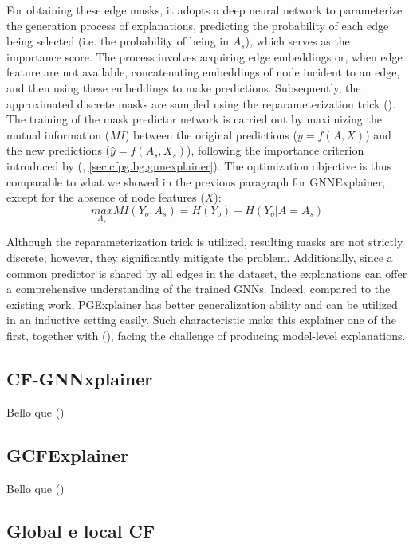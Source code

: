 \documentclass[binding=0.6cm]{sapthesis}
\newcommand{\mycite}[1]{(\cite{#1})}
\begin{document}
For obtaining these edge masks, it adopts a deep neural network to parameterize the generation process of explanations, predicting the probability of each edge being selected (i.e. the probability of being in $A_s$), which serves as the importance score. The process involves acquiring edge embeddings or, when edge feature are not available, concatenating embeddings of node incident to an edge, and then using these embeddings to make predictions. Subsequently, the approximated discrete masks are sampled using the reparameterization trick \mycite{niculae2023-discrete}. The training of the mask predictor network is carried out by maximizing the mutual information ($MI$) between the original predictions ($y = f(A,X)$) and the new predictions ($\hat y = f(A_s,X_s)$), following the importance criterion introduced by (\cite{ying2019-gnnexplainer}, \cref{sec:cfpg.bg.gnnexplainer}). The optimization objective is thus comparable to what we showed in the previous paragraph for GNNExplainer, except for the absence of node features ($X$): 
\begin{equation}
    \underset{A_s}{max} MI(Y_o,A_s) = H(Y_o) - H(Y_o| A = A_s)
    \label{eq:cfpg.bg.mutual-info-pge}
\end{equation}

Although the reparameterization trick is utilized, resulting masks are not strictly discrete; however, they significantly mitigate the  problem. Additionally, since a common predictor is shared by all edges in the dataset, the explanations can offer a comprehensive understanding of the trained GNNs. Indeed, compared to the existing work, PGExplainer has better generalization ability and can be utilized in an inductive setting easily. Such characteristic make this explainer one of the first, together with \mycite{yuan2020-xgnn}, facing the challenge of producing model-level explanations.   

\subsection{CF-GNNxplainer}
\label{sec:cfpg.bg.cf-gnn}
Bello que \mycite{lucic2022-cfgnnexplainer}

\subsection{GCFExplainer}
\label{sec:cfpg.bg.globalCF}
Bello que \mycite{huang2023-globalCF}



\subsection{Global e local CF}
\label{sec:cfpg.bg.global-local-expl}
\end{document}
